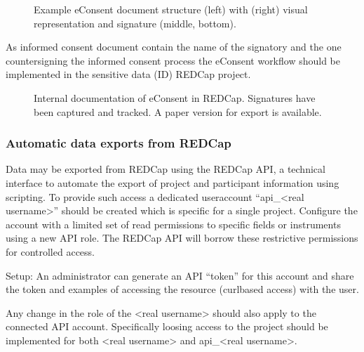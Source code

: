 \documentclass[letterpaper,10pt,english]{sphinxmanual}
\begin{document}
\begin{figure}[htbp]
\centering
\capstart

\noindent{}
\caption{Example e\sphinxhyphen{}Consent document structure (left) with (right) visual representation and signature (middle, bottom).}\label{\detokenize{EndUser/index:id6}}\end{figure}

\sphinxAtStartPar
As informed consent document contain the name of the signatory and the one countersigning the informed consent process the e\sphinxhyphen{}Consent workflow should be implemented in the sensitive data (ID) REDCap project.

\begin{figure}[htbp]
\centering
\capstart

\noindent{}
\caption{Internal documentation of e\sphinxhyphen{}Consent in REDCap. Signatures have been captured and tracked. A paper version for export is available.}\label{\detokenize{EndUser/index:id7}}\end{figure}


\subsubsection{Automatic data exports from REDCap}
\label{\detokenize{EndUser/index:automatic-data-exports-from-redcap}}
\sphinxAtStartPar
Data may be exported from REDCap using the REDCap API, a technical interface to automate the export of project and participant information using scripting. To provide such access a dedicated user\sphinxhyphen{}account “api\_\textless{}real username\textgreater{}” should be created which is specific for a single project. Configure the account with a limited set of read permissions to specific fields or instruments using a new API role. The REDCap API will borrow these restrictive permissions for controlled access.

\sphinxAtStartPar
Setup: An administrator can generate an API “token” for this account and share the token and examples of accessing the resource (curl\sphinxhyphen{}based access) with the user.

\sphinxAtStartPar
Any change in the role of the \textless{}real username\textgreater{} should also apply to the connected API account. Specifically loosing access to the project should be implemented for both \textless{}real username\textgreater{} and api\_\textless{}real username\textgreater{}.
\end{document}
